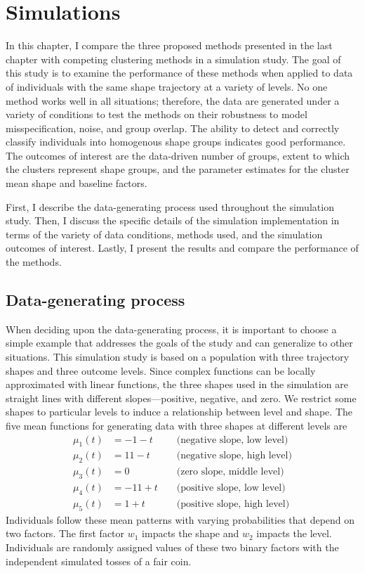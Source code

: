 \chapter{Simulations}
\label{chap:sim}
In this chapter, I compare the three proposed methods presented in the last chapter with competing clustering methods in a simulation study. The goal of this study is to examine the performance of these methods when applied to data of individuals with the same shape trajectory at a variety of levels. No one method works well in all situations; therefore, the data are generated under a variety of conditions to test the methods on their robustness to model misspecification, noise, and group overlap. The ability to detect and correctly classify individuals into homogenous shape groups indicates good performance. The outcomes of interest are the data-driven number of groups, extent to which the clusters represent shape groups, and the parameter estimates for the cluster mean shape and baseline factors. 

First, I describe the data-generating process used throughout the simulation study. Then, I discuss the specific details of the simulation implementation in terms of the variety of data conditions, methods used, and the simulation outcomes of interest. Lastly, I present the results and compare the performance of the methods.

\section{Data-generating process}
When deciding upon the data-generating process, it is important to choose a simple example that addresses the goals of the study and can generalize to other situations. This simulation study is based on a population with three trajectory shapes and three outcome levels. Since complex functions can be locally approximated with linear functions, the three shapes used in the simulation are straight lines with different slopes---positive, negative, and zero. We restrict some shapes to particular levels to induce a relationship between level and shape. The five mean functions for generating data with three shapes at different levels are  
\begin{align*}
\mu_{1}(t) &= -1 - t &&\text{ (negative slope, low level)}\\
\mu_{2}(t) &= 11 - t&&\text{ (negative slope, high level)}\\
\mu_{3}(t) &= 0&&\text{ (zero slope, middle level)}\\
\mu_{4}(t) &= -11 + t&&\text{ (positive slope, low level)}\\
\mu_{5}(t) &= 1 + t&&\text{ (positive slope, high level)}
\end{align*} 
Individuals follow these mean patterns with varying probabilities that depend on two factors. The first factor $w_{1}$ impacts the shape and $w_{2}$ impacts the level. Individuals are randomly assigned values of these two binary factors with the independent simulated tosses of a fair coin. 

